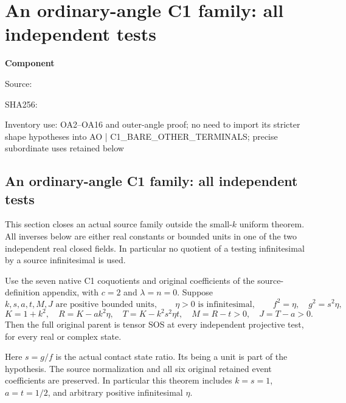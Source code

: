 \chapter{An ordinary-angle C1 family: all independent tests}
\label{component:p18a57c9c271d}
\noindent\textbf{Component }\par
{\small\noindent Source: \par}
{\small\noindent SHA256: \par}
{\small\noindent Inventory use: OA2–OA16 and outer-angle proof; no need to import its stricter shape hypotheses into AO | C1\_\allowbreak{}BARE\_\allowbreak{}OTHER\_\allowbreak{}TERMINALS; precise subordinate uses retained below\par}
\medskip
\section{An ordinary-angle C1 family: all independent tests}
\label{p18a57c9c271d:sec:c1-ordinary-angle}

This section closes an actual source family outside the small-$k$
uniform theorem. All inverses below are either real constants or
bounded units in one of the two independent real closed fields.
In particular no quotient of a testing infinitesimal by a source
infinitesimal is used.

\begin{theorem}
\label{p18a57c9c271d:thm:c1-ordinary-angle}
Use the seven native C1 coquotients and original coefficients of
the source-definition appendix, with $c=2$ and $\lambda=n=0$.
Suppose
\[
 k,s,a,t,M,J\text{ are positive bounded units},\qquad
 \eta>0\text{ is infinitesimal},\qquad
 f^2=\eta,\quad g^2=s^2\eta,
\]
\[
 K=1+k^2,\quad R=K-ak^2\eta,\quad T=K-k^2s^2\eta t,
 \quad M=R-t>0,\quad J=T-a>0.                 \tag{OA1}
\]
Then the full original parent is tensor SOS at every independent
projective test, for every real or complex state.
\end{theorem}

Here $s=g/f$ is the actual contact state ratio. Its being a unit is
part of the hypothesis. The source normalization and all six original
retained event coefficients are preserved. In particular this theorem
includes $k=s=1$, $a=t=1/2$, and arbitrary positive infinitesimal $\eta$.

